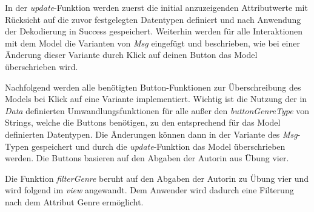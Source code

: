 \documentclass[usegeometry=true]{scrartcl}
\begin{document}
In der \textit{update}-Funktion werden zuerst die initial anzuzeigenden Attributwerte mit Rücksicht auf die zuvor festgelegten Datentypen definiert und nach Anwendung der Dekodierung in Success gespeichert. 
Weiterhin werden für alle Interaktionen mit dem Model die Varianten von \textit{Msg} eingefügt und beschrieben, wie bei einer Änderung dieser Variante durch Klick auf deinen Button das Model überschrieben wird.

Nachfolgend werden alle benötigten Button-Funktionen zur Überschreibung des Models bei Klick auf eine Variante implementiert.
Wichtig ist die Nutzung der in \textit{Data} definierten Umwandlungsfunktionen für alle außer den \textit{buttonGenreType} von Strings, welche die Buttons benötigen, zu den entsprechend für das Model definierten Datentypen. 
Die Änderungen können dann in der Variante des \textit{Msg}-Typen gespeichert und durch die \textit{update}-Funktion das Model überschrieben werden.
Die Buttons basieren auf den Abgaben der Autorin aus Übung vier.

Die Funktion \textit{filterGenre} beruht auf den Abgaben der Autorin zu Übung vier und wird folgend im \textit{view} angewandt. 
Dem Anwender wird dadurch eine Filterung nach dem Attribut Genre ermöglicht.
\end{document}
